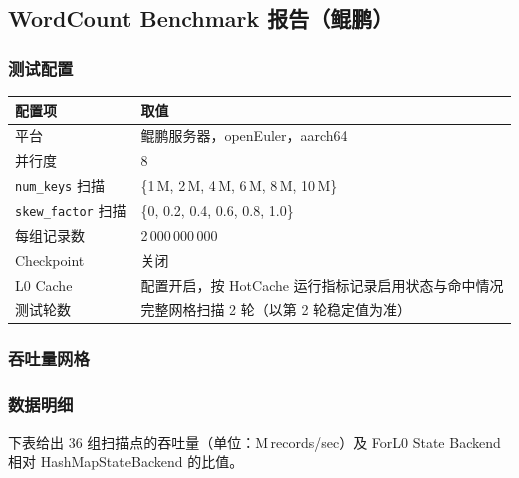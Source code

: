 \documentclass[a4paper,11pt]{article}
\newcommand{\project}{ForL0 State Backend}
\begin{document}
\subsection{WordCount Benchmark 报告（鲲鹏）}

\subsubsection{测试配置}

\begin{table}[H]
\centering
\small
\begin{tabularx}{\textwidth}{L{3.4cm} X}
\toprule
\textbf{配置项} & \textbf{取值} \\
\midrule
平台                   & 鲲鹏服务器，openEuler，aarch64 \\
并行度                 & 8 \\
\texttt{num\_keys} 扫描 & \{1\,M, 2\,M, 4\,M, 6\,M, 8\,M, 10\,M\} \\
\texttt{skew\_factor} 扫描 & \{0, 0.2, 0.4, 0.6, 0.8, 1.0\} \\
每组记录数             & 2\,000\,000\,000 \\
Checkpoint             & 关闭 \\
L0 Cache               & 配置开启，按 HotCache 运行指标记录启用状态与命中情况 \\
测试轮数               & 完整网格扫描 2 轮（以第 2 轮稳定值为准） \\
\bottomrule
\end{tabularx}
\end{table}

\subsubsection{吞吐量网格}


\FloatBarrier

\subsubsection{数据明细}

下表给出 36 组扫描点的吞吐量（单位：M\,records/sec）及 \project{} 相对 HashMapStateBackend 的比值。
\end{document}
